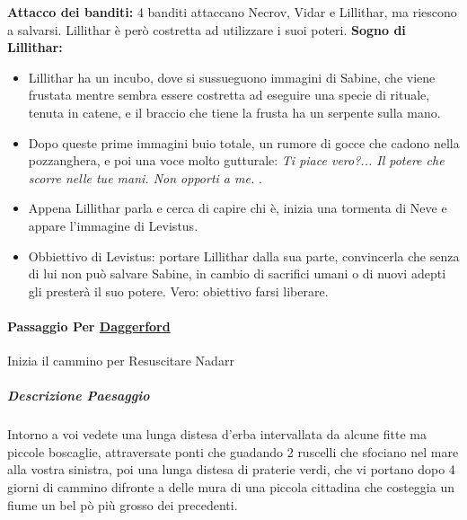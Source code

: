\documentclass{article}
\begin{document}
        \textbf{Attacco dei banditi: } 4 banditi attaccano Necrov, Vidar e Lillithar, ma riescono a salvarsi. Lillithar è però costretta ad utilizzare i suoi poteri.
        \textbf{Sogno di Lillithar:} \begin{itemize}
            \item Lillithar ha un incubo, dove si sussueguono immagini di Sabine, che viene frustata mentre sembra essere costretta ad eseguire una specie di rituale, tenuta in catene, e il braccio che tiene la frusta ha un serpente sulla mano. 
            \item Dopo queste prime immagini buio totale, un rumore di gocce che cadono nella pozzanghera, e poi una voce molto gutturale: \textit{Ti piace vero?... Il potere che scorre nelle tue mani. Non opporti a me.} . 
            \item Appena Lillithar parla e cerca di capire chi è, inizia una tormenta di Neve e appare l'immagine di Levistus.
            \item Obbiettivo di Levistus: portare Lillithar dalla sua parte, convincerla che senza di lui non può salvare Sabine, in cambio di sacrifici umani o di nuovi adepti gli presterà il suo potere. Vero: obiettivo farsi liberare. 
        
        \end{itemize}
            \paragraph{Passaggio Per \href{https://forgottenmaps.web.app/map/Daggerford}{Daggerford}} Inizia il cammino per Resuscitare Nadarr
            \subparagraph{Descrizione Paesaggio} Intorno a voi vedete una lunga distesa d'erba intervallata da alcune fitte ma piccole boscaglie, attraversate ponti che guadando 2 ruscelli che sfociano nel mare alla vostra sinistra, poi una lunga distesa di praterie verdi, che vi portano dopo 4 giorni di cammino difronte a delle mura di una piccola cittadina che costeggia un fiume un bel pò più grosso dei precedenti.  
\end{document}

